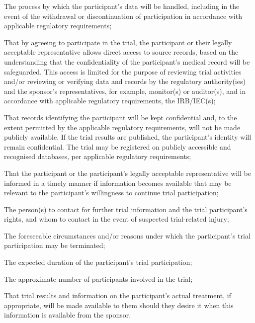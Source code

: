 \documentclass[11pt]{article}
\begin{document}
\begin{description}[leftmargin=2.5cm,style=sameline]
\item[(n)] The process by which the participant's data will be handled, including in the event of the withdrawal or discontinuation of participation in accordance with applicable regulatory requirements;

\item[(o)] That by agreeing to participate in the trial, the participant or their legally acceptable representative allows direct access to source records, based on the understanding that the confidentiality of the participant's medical record will be safeguarded. This access is limited for the purpose of reviewing trial activities and/or reviewing or verifying data and records by the regulatory authority(ies) and the sponsor's representatives, for example, monitor(s) or auditor(s), and in accordance with applicable regulatory requirements, the IRB/IEC(s);

\item[(p)] That records identifying the participant will be kept confidential and, to the extent permitted by the applicable regulatory requirements, will not be made publicly available. If the trial results are published, the participant's identity will remain confidential. The trial may be registered on publicly accessible and recognised databases, per applicable regulatory requirements;

\item[(q)] That the participant or the participant's legally acceptable representative will be informed in a timely manner if information becomes available that may be relevant to the participant's willingness to continue trial participation;

\item[(r)] The person(s) to contact for further trial information and the trial participant's rights, and whom to contact in the event of suspected trial-related injury;

\item[(s)] The foreseeable circumstances and/or reasons under which the participant's trial participation may be terminated;

\item[(t)] The expected duration of the participant's trial participation;

\item[(u)] The approximate number of participants involved in the trial;

\item[(v)] That trial results and information on the participant's actual treatment, if appropriate, will be made available to them should they desire it when this information is available from the sponsor.

\end{description}
\end{document}
